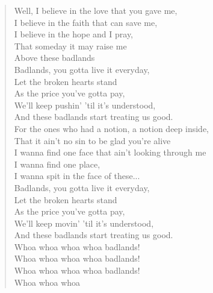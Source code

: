 \begin{verse}
Well, I believe in the love that you gave me,\\
I believe in the faith that can save me,\\
I believe in the hope and I pray,\\
That someday it may raise me\\
Above these badlands\\

Badlands, you gotta live it everyday,\\
Let the broken hearts stand\\
As the price you've gotta pay,\\
We'll keep pushin' 'til it's understood,\\
And these badlands start treating us good.\\

For the ones who had a notion, a notion deep inside,\\
That it ain't no sin to be glad you're alive\\
I wanna find one face that ain't looking through me\\
I wanna find one place,\\
I wanna spit in the face of these...\\

Badlands, you gotta live it everyday,\\
Let the broken hearts stand\\
As the price you've gotta pay,\\
We'll keep movin' 'til it's understood,\\
And these badlands start treating us good.\\

Whoa whoa whoa whoa badlands!\\
Whoa whoa whoa whoa badlands!\\
Whoa whoa whoa whoa badlands!\\
Whoa whoa whoa\\
\end{verse}

